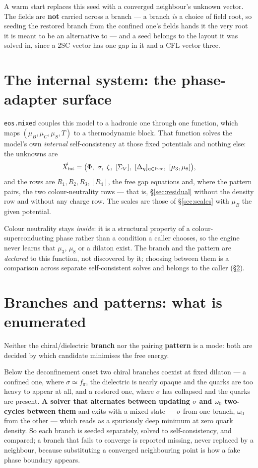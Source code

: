 \documentclass[11pt,a4paper]{article}
\newcommand{\code}[1]{\texttt{#1}}
\begin{document}
A warm start replaces this seed with a converged neighbour's unknown vector.
The fields are \textbf{not} carried across a branch --- a branch \emph{is} a
choice of field root, so seeding the restored branch from the confined one's
fields hands it the very root it is meant to be an alternative to --- and a
seed belongs to the layout it was solved in, since a 2SC vector has one gap in
it and a CFL vector three.

\section{The internal system: the phase-adapter surface}
\label{sec:internal}

\code{eos.mixed} couples this model to a hadronic one through one function,
which maps $(\mu_B,\mu_C,\mu_S,T)$ to a thermodynamic block. That function
solves the model's own \emph{internal} self-consistency at those fixed
potentials and nothing else: the unknowns are
\begin{equation}
\vec X_{\rm int} = \bigl(\Phi,\ \sigma,\ \zeta,\ [\Sigma_V],\
 [\Delta_\eta]_{\eta\in\rm free},\ [\mu_3,\mu_8]\bigr),
\end{equation}
and the rows are $R_1,R_2,R_3,[R_4]$, the free gap equations and, where the
pattern pairs, the two colour-neutrality rows --- that is,
\S\ref{sec:residual} without the density row and without any charge row. The
scales are those of \S\ref{sec:scales} with $\mu_B$ the given potential.

Colour neutrality stays \emph{inside}: it is a structural property of a
colour-superconducting phase rather than a condition a caller chooses, so the
engine never learns that $\mu_3$, $\mu_8$ or a dilaton exist. The branch and
the pattern are \emph{declared} to this function, not discovered by it;
choosing between them is a comparison across separate self-consistent solves
and belongs to the caller (\S\ref{sec:branches}).

\section{Branches and patterns: what is enumerated}
\label{sec:branches}

Neither the chiral/dielectric \textbf{branch} nor the pairing \textbf{pattern}
is a mode: both are decided by which candidate minimises the free energy.

Below the deconfinement onset two chiral branches coexist at fixed dilaton ---
a confined one, where $\sigma\simeq f_\pi$, the dielectric is nearly opaque and
the quarks are too heavy to appear at all, and a restored one, where $\sigma$
has collapsed and the quarks are present. \textbf{A solver that alternates
between updating $\sigma$ and $\omega_0$ two-cycles between them} and exits
with a mixed state --- $\sigma$ from one branch, $\omega_0$ from the other ---
which reads as a spuriously deep minimum at zero quark density. So each branch
is seeded separately, solved to self-consistency, and compared; a branch that
fails to converge is reported missing, never replaced by a
neighbour, because substituting a converged neighbouring point is how a fake
phase boundary appears.
\end{document}

